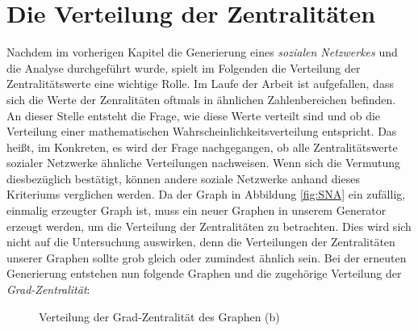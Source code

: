 \section{Die Verteilung der Zentralitäten}
Nachdem im vorherigen Kapitel die Generierung eines \textit{sozialen Netzwerkes} und die Analyse durchgeführt wurde, spielt im Folgenden die Verteilung der Zentralitätswerte eine wichtige Rolle.
Im Laufe der Arbeit ist aufgefallen, dass sich die Werte der Zenralitäten oftmals in ähnlichen Zahlenbereichen befinden. An dieser Stelle entsteht die Frage, wie diese Werte verteilt sind und ob die Verteilung einer mathematischen Wahrscheinlichkeitsverteilung entspricht. Das heißt, im Konkreten, es wird der Frage nachgegangen, ob alle Zentralitätswerte sozialer Netzwerke ähnliche Verteilungen nachweisen. Wenn sich die Vermutung diesbezüglich bestätigt, können andere soziale Netzwerke anhand dieses Kriteriums verglichen werden.
Da der Graph in Abbildung \ref{fig:SNA} ein zufällig, einmalig erzeugter Graph ist, muss ein neuer Graphen in unserem Generator erzeugt werden, um die Verteilung der Zentralitäten zu betrachten. Dies wird sich nicht auf die Untersuchung auswirken, denn die Verteilungen der Zentralitäten unserer Graphen sollte grob gleich oder zumindest ähnlich sein. Bei der erneuten Generierung entstehen nun folgende Graphen und die zugehörige Verteilung der \textit{Grad-Zentralität}:

\FloatBarrier
\begin{figure}[h!]%
  \centering
  \qquad
  \caption{Verteilung der Grad-Zentralität des Graphen (b)}%
  \label{fig:distribution}
\end{figure}
\FloatBarrier

